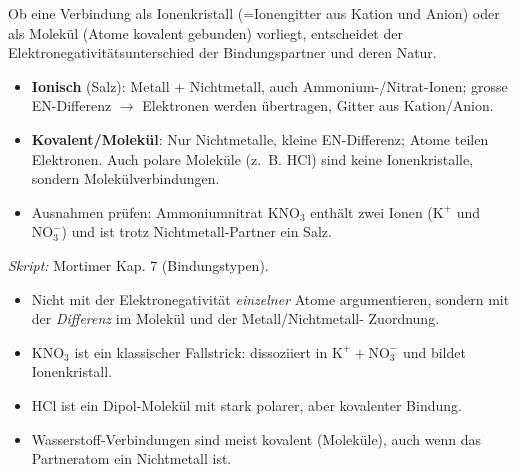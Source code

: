 
Ob eine Verbindung als Ionenkristall (=Ionengitter aus Kation und Anion) oder
als Molekül (Atome kovalent gebunden) vorliegt, entscheidet der
Elektronegativitätsunterschied der Bindungspartner und deren Natur.

\begin{werkzeugkasten}
\begin{itemize}
  \item \textbf{Ionisch} (Salz): Metall + Nichtmetall, auch
        Ammonium-/Nitrat-Ionen; grosse EN-Differenz $\to$ Elektronen werden
        übertragen, Gitter aus Kation/Anion.
  \item \textbf{Kovalent/Molekül}: Nur Nichtmetalle, kleine EN-Differenz; Atome
        teilen Elektronen. Auch polare Moleküle (z.\ B. $\mathrm{HCl}$) sind keine
        Ionenkristalle, sondern Molekülverbindungen.
  \item Ausnahmen prüfen: Ammoniumnitrat $\mathrm{KNO_3}$ enthält zwei Ionen
        ($\mathrm{K^+}$ und $\mathrm{NO_3^-}$) und ist trotz Nichtmetall-Partner
        ein Salz.
\end{itemize}
\textit{Skript:} Mortimer Kap. 7 (Bindungstypen).
\end{werkzeugkasten}

\begin{achtung}
\begin{itemize}
  \item Nicht mit der Elektronegativität \textit{einzelner} Atome argumentieren,
        sondern mit der \textit{Differenz} im Molekül und der Metall/Nichtmetall-
        Zuordnung.
  \item $\mathrm{KNO_3}$ ist ein klassischer Fallstrick: dissoziiert in
        $\mathrm{K^+}+\mathrm{NO_3^-}$ und bildet Ionenkristall.
  \item $\mathrm{HCl}$ ist ein Dipol-Molekül mit stark polarer, aber kovalenter Bindung.
  \item Wasserstoff-Verbindungen sind meist kovalent (Moleküle), auch wenn das
        Partneratom ein Nichtmetall ist.
\end{itemize}
\end{achtung}
